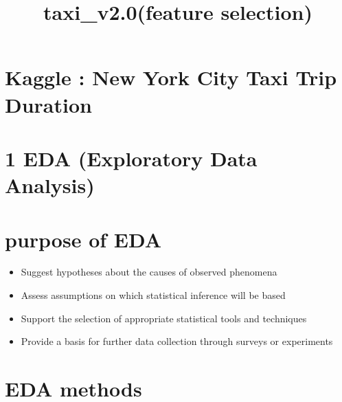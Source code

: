 \documentclass[11pt]{article}
\title{taxi\_v2.0(feature selection)}
\providecommand{\tightlist}{%
      \setlength{\itemsep}{0pt}\setlength{\parskip}{0pt}}
\begin{document}
    
    
    \maketitle
    
    

    
    \section{Kaggle : New York City Taxi Trip
Duration}\label{kaggle-new-york-city-taxi-trip-duration}

    

    \section{1 EDA (Exploratory Data
Analysis)}\label{eda-exploratory-data-analysis}

    \section{purpose of EDA}\label{purpose-of-eda}

\begin{itemize}
\tightlist
\item
  Suggest hypotheses about the causes of observed phenomena
\item
  Assess assumptions on which statistical inference will be based
\item
  Support the selection of appropriate statistical tools and techniques
\item
  Provide a basis for further data collection through surveys or
  experiments
\end{itemize}

    \section{EDA methods}\label{eda-methods}
\end{document}
